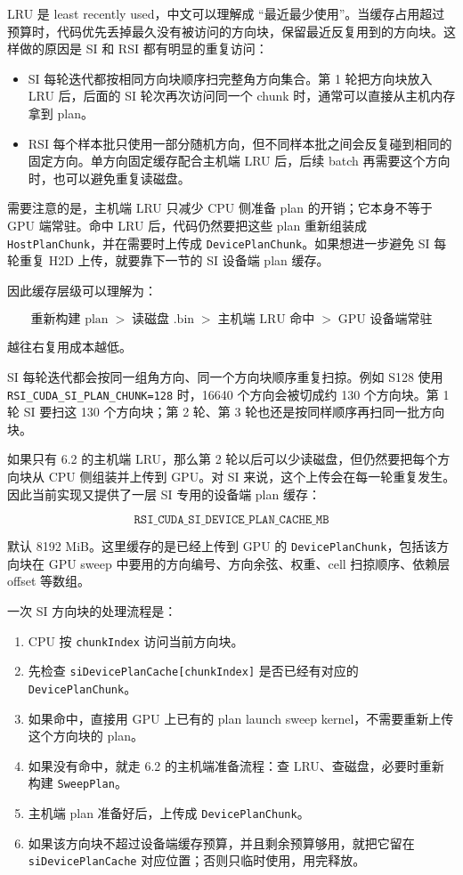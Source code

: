 \documentclass[10pt]{article}
\newcommand{\subsect}[1]{\vspace{2mm}{\sffamily\large\bfseries #1}\par}
\newcommand{\code}[1]{\texttt{#1}}
\begin{document}
LRU 是 least recently used，中文可以理解成 ``最近最少使用''。当缓存占用超过预算时，代码优先丢掉最久没有被访问的方向块，保留最近反复用到的方向块。这样做的原因是 SI 和 RSI 都有明显的重复访问：

\begin{itemize}
\item SI 每轮迭代都按相同方向块顺序扫完整角方向集合。第 1 轮把方向块放入 LRU 后，后面的 SI 轮次再次访问同一个 chunk 时，通常可以直接从主机内存拿到 plan。
\item RSI 每个样本批只使用一部分随机方向，但不同样本批之间会反复碰到相同的固定方向。单方向固定缓存配合主机端 LRU 后，后续 batch 再需要这个方向时，也可以避免重复读磁盘。
\end{itemize}

需要注意的是，主机端 LRU 只减少 CPU 侧准备 plan 的开销；它本身不等于 GPU 端常驻。命中 LRU 后，代码仍然要把这些 plan 重新组装成 \code{HostPlanChunk}，并在需要时上传成 \code{DevicePlanChunk}。如果想进一步避免 SI 每轮重复 H2D 上传，就要靠下一节的 SI 设备端 plan 缓存。

因此缓存层级可以理解为：

\[
\text{重新构建 plan} \;>\; \text{读磁盘 .bin} \;>\; \text{主机端 LRU 命中} \;>\; \text{GPU 设备端常驻}
\]

越往右复用成本越低。

\subsect{6.3 SI 设备端 plan 缓存}

SI 每轮迭代都会按同一组角方向、同一个方向块顺序重复扫掠。例如 S128 使用 \code{RSI\_CUDA\_SI\_PLAN\_CHUNK=128} 时，16640 个方向会被切成约 130 个方向块。第 1 轮 SI 要扫这 130 个方向块；第 2 轮、第 3 轮也还是按同样顺序再扫同一批方向块。

如果只有 6.2 的主机端 LRU，那么第 2 轮以后可以少读磁盘，但仍然要把每个方向块从 CPU 侧组装并上传到 GPU。对 SI 来说，这个上传会在每一轮重复发生。因此当前实现又提供了一层 SI 专用的设备端 plan 缓存：

\[
\code{RSI\_CUDA\_SI\_DEVICE\_PLAN\_CACHE\_MB}
\]

默认 8192 MiB。这里缓存的是已经上传到 GPU 的 \code{DevicePlanChunk}，包括该方向块在 GPU sweep 中要用的方向编号、方向余弦、权重、cell 扫掠顺序、依赖层 offset 等数组。

一次 SI 方向块的处理流程是：

\begin{enumerate}
\item CPU 按 \code{chunkIndex} 访问当前方向块。
\item 先检查 \code{siDevicePlanCache[chunkIndex]} 是否已经有对应的 \code{DevicePlanChunk}。
\item 如果命中，直接用 GPU 上已有的 plan launch sweep kernel，不需要重新上传这个方向块的 plan。
\item 如果没有命中，就走 6.2 的主机端准备流程：查 LRU、查磁盘，必要时重新构建 \code{SweepPlan}。
\item 主机端 plan 准备好后，上传成 \code{DevicePlanChunk}。
\item 如果该方向块不超过设备端缓存预算，并且剩余预算够用，就把它留在 \code{siDevicePlanCache} 对应位置；否则只临时使用，用完释放。
\end{enumerate}
\end{document}
